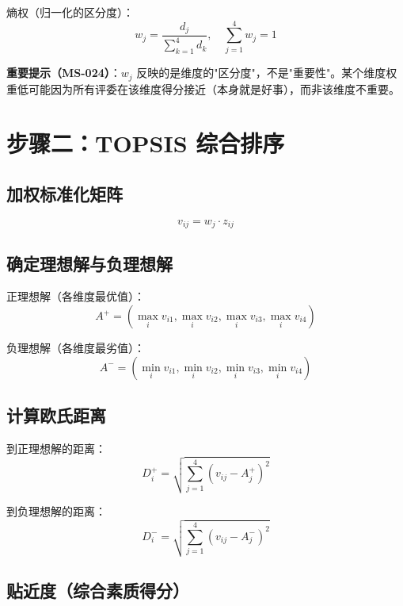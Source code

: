 \documentclass[UTF8]{ctexart}
\begin{document}
熵权（归一化的区分度）：
\begin{equation}
w_j = \frac{d_j}{\sum_{k=1}^{4} d_k}, \quad \sum_{j=1}^{4} w_j = 1
\end{equation}

\textbf{重要提示（MS-024）}：$w_j$ 反映的是维度的"区分度"，不是"重要性"。某个维度权重低可能因为所有评委在该维度得分接近（本身就是好事），而非该维度不重要。

\section{步骤二：TOPSIS 综合排序}

\subsection{加权标准化矩阵}

\begin{equation}
v_{ij} = w_j \cdot z_{ij}
\end{equation}

\subsection{确定理想解与负理想解}

正理想解（各维度最优值）：
\begin{equation}
A^+ = (\max_i v_{i1}, \max_i v_{i2}, \max_i v_{i3}, \max_i v_{i4})
\end{equation}

负理想解（各维度最劣值）：
\begin{equation}
A^- = (\min_i v_{i1}, \min_i v_{i2}, \min_i v_{i3}, \min_i v_{i4})
\end{equation}

\subsection{计算欧氏距离}

到正理想解的距离：
\begin{equation}
D_i^+ = \sqrt{\sum_{j=1}^{4} (v_{ij} - A_j^+)^2}
\end{equation}

到负理想解的距离：
\begin{equation}
D_i^- = \sqrt{\sum_{j=1}^{4} (v_{ij} - A_j^-)^2}
\end{equation}

\subsection{贴近度（综合素质得分）}
\end{document}
